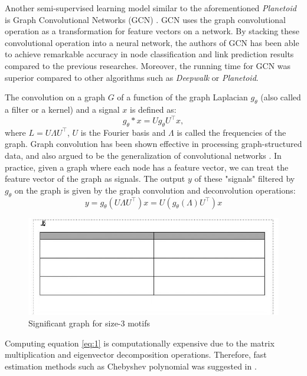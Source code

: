 \documentclass{article}
\theoremstyle{definition}
\begin{document}
Another semi-supervised learning model similar to the aforementioned
\emph{Planetoid} is Graph Convolutional Networks (GCN) \cite{gcn}. 
GCN uses the graph convolutional operation as a transformation for 
feature vectors on a network. By stacking these convolutional operation 
into a neural network, the authors of GCN has been able to achieve 
remarkable accuracy in node classification and link prediction results 
compared to the previous researches. Moreover, the running time for GCN 
was superior compared to other algorithms such as \emph{Deepwalk} or 
\emph{Planetoid}.

The convolution on a graph $G$ of a function of the graph 
Laplacian $g_{\theta}$ (also called a filter or a kernel) 
and a signal $x$ is defined as:
$$g_{\theta} \ast x = U g_{\theta} U^{\top} x,$$
where $L = U \Lambda U^\top$, $U$ is the Fourier basis
and $\Lambda$ is called the frequencies of the graph. 
Graph convolution has been shown effective in processing
graph-structured data, and also argued to be the generalization
of convolutional networks
\cite{shuman2013emerging,defferrard2016convolutional,gcn}.
In practice, given a graph where each node has a feature vector,
we can treat the feature vector of the graph as signals. The output $y$
of these "signals" filtered by $g_\theta$ on the graph is given by
the graph convolution and deconvolution operations: 
\begin{equation}
\label{eq:1}
y = g_\theta (U \Lambda U^\top) x = U (g_\theta(\Lambda) U^\top)x
\end{equation}

\begin{figure} \label{fig:sigm3}
    \centering
    \includegraphics[width=0.9\linewidth]{foo_2col}
    \caption{Significant graph for size-3 motifs}
\end{figure}


Computing equation \ref{eq:1} is computationally expensive
due to the matrix multiplication and eigenvector decomposition operations.
Therefore, fast estimation methods such as Chebyshev polynomial was suggested
in \cite{hammond2011wavelets}.
\end{document}
